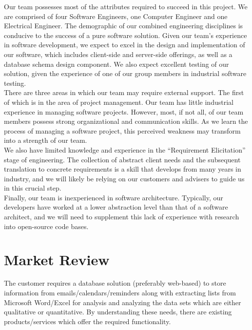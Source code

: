 \documentclass[11pt]{article}
\begin{document}
Our team possesses most of the attributes required to succeed in this project. We are comprised of four Software Engineers, one Computer Engineer and one Electrical Engineer. The demographic of our combined engineering disciplines is conducive to the success of a pure software solution. Given our team's experience in software development, we expect to excel in the design and implementation of our software, which includes client-side and server-side offerings, as well as a database schema design component. We also expect excellent testing of our solution, given the experience of one of our group members in industrial software testing. \\

There are three areas in which our team may require external support. The first of which is in the area of project management. Our team has little industrial experience in managing software projects. However, most, if not all, of our team members possess strong organizational and communication skills. As we learn the process of managing a software project, this perceived weakness may transform into a strength of our team.  \\

We also have limited knowledge and experience in the “Requirement Elicitation” stage of engineering. The collection of abstract client needs and the subsequent translation to concrete requirements is a skill that develops from many years in industry, and we will likely be relying on our customers and advisers to guide us in this crucial step.  \\

Finally, our team is inexperienced in software architecture. Typically, our developers have worked at a lower abstraction level than that of a software architect, and we will need to supplement this lack of experience with research into open-source code bases. \\

\newpage

\section*{Market Review}

The customer requires a database solution (preferably web-based) to store information from emails/calendars/reminders along with extracting lists from Microsoft Word/Excel for analysis and analyzing the data sets which are either qualitative or quantitative. By understanding these needs, there are existing products/services which offer the required functionality. \\
\end{document}
